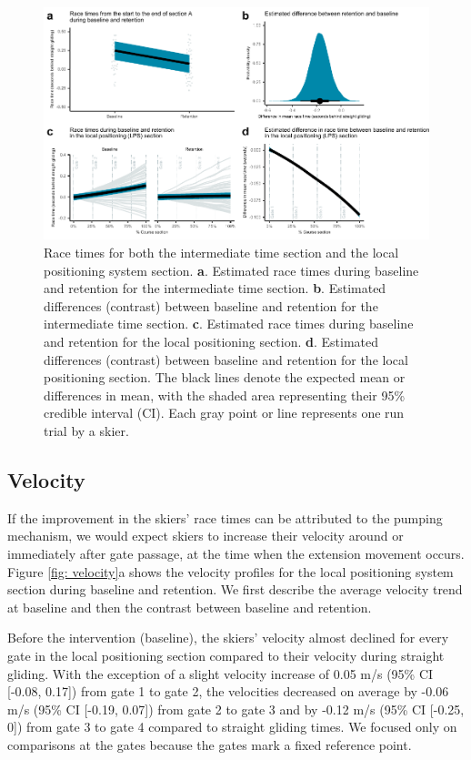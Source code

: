 \documentclass{article}
\begin{document}
\begin{figure}[H]
\centering
\includegraphics{figurer/figure_racetime_2.pdf}
\caption{Race times for both the intermediate time section and the local positioning system section. \textbf{a}. Estimated race times during baseline and retention for the intermediate time section. \textbf{b}. Estimated differences (contrast) between baseline and retention for the intermediate time section. \textbf{c}. Estimated race times during baseline and retention for the local positioning section. \textbf{d}. Estimated differences (contrast) between baseline and retention for the local positioning section. The black lines denote the expected mean or differences in mean, with the shaded area representing their 95\% credible interval (CI). Each gray point or line represents one run trial by a skier.}\label{fig: racetimes}
\end{figure}

\subsection{Velocity}
If the improvement in the skiers' race times can be attributed to the pumping mechanism, we would expect skiers to increase their velocity around or immediately after gate passage, at the time when the extension movement occurs.  Figure \ref{fig: velocity}a shows the velocity profiles for the local positioning system section during baseline and retention. We first describe the average velocity trend at baseline and then the contrast between baseline and retention.

Before the intervention (baseline), the skiers' velocity almost declined for every gate in the local positioning section compared to their velocity during straight gliding. With the exception of a slight velocity increase of 0.05 m/s (95\% CI [-0.08, 0.17]) from gate 1 to gate 2, the velocities decreased on average by -0.06 m/s (95\% CI [-0.19, 0.07]) from gate 2 to gate 3 and by -0.12 m/s (95\% CI [-0.25, 0]) from gate 3 to gate 4 compared to straight gliding times. We focused only on comparisons at the gates because the gates mark a fixed reference point. 
\end{document}
